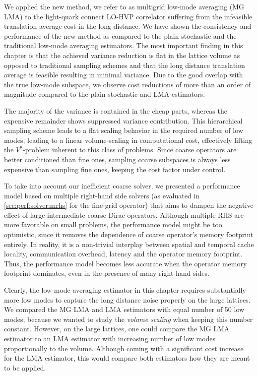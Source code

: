 We applied the new method, we refer to as multigrid low-mode averaging (MG LMA) to the light-quark connect LO-HVP correlator suffering from the infeasible translation average cost in the long distance.
We have shown the consistency and performance of the new method as compared to the plain stochastic and the traditional low-mode averaging estimators.
The most important finding in this chapter is that the achieved variance reduction is flat in the lattice volume as opposed to traditional sampling schemes and that the long distance translation average is feasible resulting in minimal variance.
Due to the good overlap with the true low-mode subspace, we observe cost reductions of more than an order of magnitude compared to the plain stochastic and LMA estimators.

The majority of the variance is contained in the cheap parts, whereas the expensive remainder shows suppressed variance contribution.
This hierarchical sampling scheme leads to a flat scaling behavior in the required number of low modes, leading to a linear volume-scaling in computational cost, effectively lifting the $V^{2}$-problem inherent to this class of problems.
Since coarse operators are better conditioned than fine ones, sampling coarse subspaces is always less expensive than sampling fine ones, keeping the cost factor under control.

To take into account our inefficient coarse solver, we presented a performance model based on multiple right-hand side solvers (as evaluated in \cref{sec:perf:solver:mrhs} for the fine-grid operator) that aims to dampen the negative effect of large intermediate coarse Dirac operators.
Although multiple RHS are more favorable on small problems, the performance model might be too optimistic, since it removes the dependence of coarse operator's memory footprint entirely.
In reality, it is a non-trivial interplay between spatial and temporal cache locality, communication overhead, latency and the operator memory footprint.
Thus, the performance model becomes less accurate when the operator memory footprint dominates, even in the presence of many right-hand sides.

Clearly, the low-mode averaging estimator in this chapter requires substantially more low modes to capture the long distance noise properly on the large lattices.
We compared the MG LMA and LMA estimators with equal number of \num{50} low modes, because we wanted to study the \emph{volume scaling} when keeping this number constant.
However, on the large lattices, one could compare the MG LMA estimator to an LMA estimator with increasing number of low modes proportionally to the volume.
Although coming with a significant cost increase for the LMA estimator, this would compare both estimators how they are meant to be applied.


